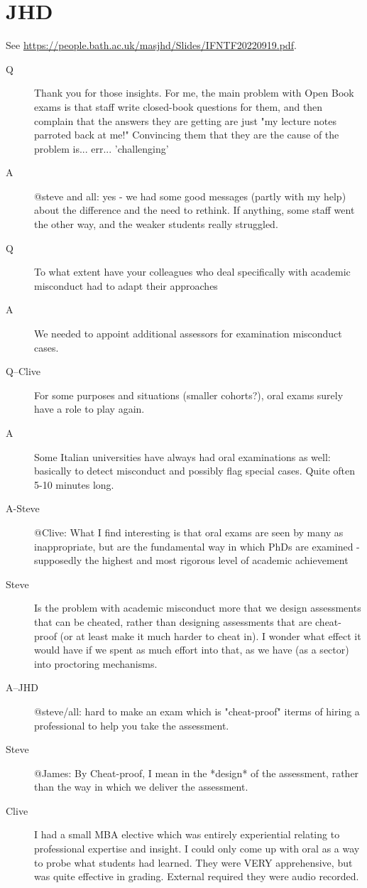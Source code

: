 \documentclass{article}
\begin{document}
\section{JHD}
See \url{https://people.bath.ac.uk/masjhd/Slides/IFNTF20220919.pdf}.
\begin{description}
\item[Q]Thank you for those insights. For me, the main problem with Open Book exams is that staff write closed-book questions for them, and then complain that the answers they are getting are just "my lecture notes parroted back at me!"  Convincing them that they are the cause of the problem is... err... 'challenging'
\item[A]@steve and all: yes - we had some good messages (partly with my help) about the difference and the need to rethink.  If anything, some staff went the other way, and the weaker students really struggled.
\item[Q]To what extent have your colleagues who deal specifically with academic misconduct had to adapt their approaches
\item[A]We needed to appoint additional assessors for examination misconduct  cases.
\item[Q--Clive]For some purposes and situations (smaller cohorts?), oral exams surely have a role to play again.
\item[A]Some Italian universities have always had oral examinations as well: basically to detect misconduct and possibly flag special cases.  Quite often 5-10 minutes long.
\item[A-Steve]@Clive:  What I find interesting is that oral exams are seen by many as inappropriate, but are the fundamental way in which PhDs are examined - supposedly the highest and most rigorous level of academic achievement
\item[Steve]Is the problem with academic misconduct more that we design assessments that can be cheated, rather than designing assessments that are cheat-proof (or at least make it much harder to cheat in). I wonder what effect it would have if we spent as much effort into that, as we have (as a sector) into proctoring mechanisms.
\item[A--JHD]@steve/all: hard to make an exam which is "cheat-proof" iterms of hiring a professional to help you take the assessment.
\item[Steve]@James: By Cheat-proof, I mean in the *design* of the assessment, rather than the way in which we deliver the assessment.
\item[Clive]I had a small  MBA elective which was entirely experiential relating to professional expertise and insight. I could only come up with oral as a way to probe what students had learned. They were VERY apprehensive, but was quite effective in grading. External required they were audio recorded.
\end{description}
\end{document}
